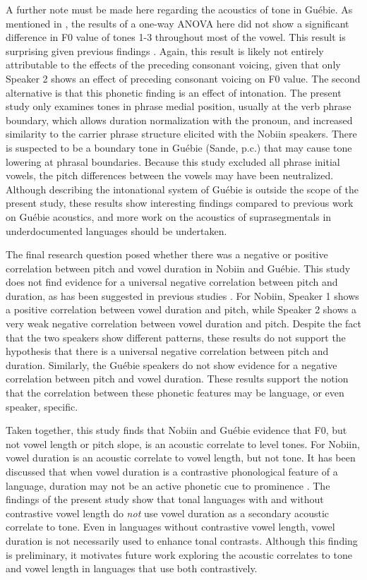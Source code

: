 \documentclass[output=paper]{langscibook}
\begin{document}
A further note must be made here regarding the acoustics of tone in Guébie. As mentioned in , the results of a one-way ANOVA here did not show a significant difference in F0 value of tones 1-3 throughout most of the vowel. This result is surprising given previous findings \citep{sande2018cross, sande2020}. Again, this result is likely not entirely attributable to the effects of the preceding consonant voicing, given that only Speaker 2 shows an effect of preceding consonant voicing on F0 value. The second alternative is that this phonetic finding is an effect of intonation. The present study only examines tones in phrase medial position, usually at the verb phrase boundary, which allows duration normalization with the pronoun, and increased similarity to the carrier phrase structure elicited with the Nobiin speakers. There is suspected to be a boundary tone in Guébie (Sande, p.c.) that may cause tone lowering at phrasal boundaries. Because this study excluded all phrase initial vowels, the pitch differences between the vowels may have been neutralized. Although describing the intonational system of Guébie is outside the scope of the present study, these results show interesting findings compared to previous work on Guébie acoustics, and more work on the acoustics of suprasegmentals in underdocumented languages should be undertaken.

The final research question posed whether there was a negative or positive correlation between pitch and vowel duration in Nobiin and Guébie. This study does not find evidence for a universal negative correlation between pitch and duration, as has been suggested in previous studies \citep{gandour1977interaction, dreher1968instrumental}. For Nobiin, Speaker 1 shows a positive correlation between vowel duration and pitch, while Speaker 2 shows a very weak negative correlation between vowel duration and pitch. Despite the fact that the two speakers show different patterns, these results do not support the hypothesis that there is a universal negative correlation between pitch and duration. Similarly, the Guébie speakers do not show evidence for a negative correlation between pitch and vowel duration. These results support the notion that the correlation between these phonetic features may be language, or even speaker, specific. 

Taken together, this study finds that Nobiin and Guébie evidence that F0, but not vowel length or pitch slope, is an acoustic correlate to level tones. For Nobiin, vowel duration is an acoustic correlate to vowel length, but not tone. It has been discussed that when vowel duration is a contrastive phonological feature of a language, duration may not be an active phonetic cue to prominence \citep{remijsen2014study}. The findings of the present study show that tonal languages with and without contrastive vowel length do \textit{not} use vowel duration as a secondary acoustic correlate to tone. Even in languages without contrastive vowel length, vowel duration is not necessarily used to enhance tonal contrasts. Although this finding is preliminary, it motivates future work exploring the acoustic correlates to tone and vowel length in languages that use both contrastively.
\end{document}

